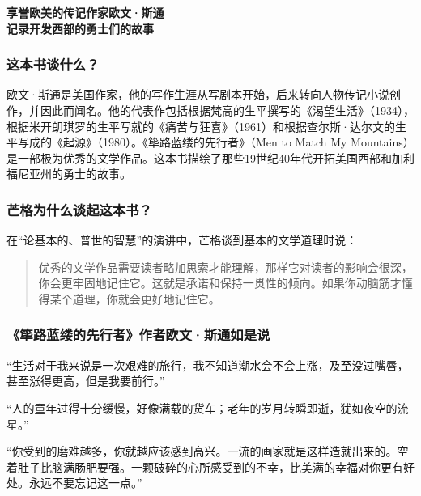 \cleardoublepage
{}


\begin{BookSummaryBox}
{\centering \textbf{享誉欧美的传记作家欧文·斯通\\ 记录开发西部的勇士们的故事}\par}
\end{BookSummaryBox}

\subsubsection*{这本书谈什么？}

欧文·斯通是美国作家，他的写作生涯从写剧本开始，后来转向人物传记小说创作，并因此而闻名。他的代表作包括根据梵高的生平撰写的《渴望生活》（1934），根据米开朗琪罗的生平写就的《痛苦与狂喜》（1961）和根据查尔斯·达尔文的生平写成的《起源》（1980）。《筚路蓝缕的先行者》（Men to Match My Mountains）是一部极为优秀的文学作品。这本书描绘了那些19世纪40年代开拓美国西部和加利福尼亚州的勇士的故事。
\par

\subsubsection*{芒格为什么谈起这本书？}

在“论基本的、普世的智慧”的演讲中，芒格谈到基本的文学道理时说：
\par

\begin{quotation}
优秀的文学作品需要读者略加思索才能理解，那样它对读者的影响会很深，你会更牢固地记住它。这就是承诺和保持一贯性的倾向。如果你动脑筋才懂得某个道理，你就会更好地记住它。
\par
\end{quotation}

\subsubsection*{《筚路蓝缕的先行者》作者欧文·斯通如是说}

“生活对于我来说是一次艰难的旅行，我不知道潮水会不会上涨，及至没过嘴唇，甚至涨得更高，但是我要前行。”
\par

“人的童年过得十分缓慢，好像满载的货车；老年的岁月转瞬即逝，犹如夜空的流星。”
\par

“你受到的磨难越多，你就越应该感到高兴。一流的画家就是这样造就出来的。空着肚子比脑满肠肥要强。一颗破碎的心所感受到的不幸，比美满的幸福对你更有好处。永远不要忘记这一点。”
\par
